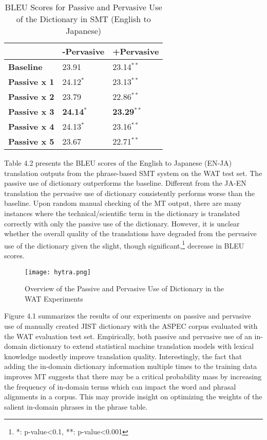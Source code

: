 \begin{table}[H]
\centering
    \begin{tabular}{l|ll}
    ~           & \textbf{-Pervasive} &\textbf{ +Pervasive }\\ \hline
    \textbf{Baseline}    & 23.91      & 23.14$^{**}$      \\ \hline
    \textbf{Passive x 1 }& 24.12$^{*}$     &  23.13$^{**}$   \\
    \textbf{Passive x 2} & 23.79    & 22.86$^{**}$      \\
    \textbf{Passive x 3 }&  \textbf{24.14$^{*}$}   & \textbf{23.29$^{**}$}      \\
    \textbf{Passive x 4 }& 24.13$^{*}$     &  23.16$^{**}$   \\
    \textbf{Passive x 5 }& 23.67      &  22.71$^{**}$   \\
    \end{tabular}
\caption{BLEU Scores for Passive and Pervasive Use of the Dictionary in SMT (English to Japanese)}
\label{table:hytraenja}
\end{table}

Table 4.2 presents the BLEU scores of the English to Japanese (EN-JA) translation outputs from the phrase-based SMT system on the WAT test set. The passive use of dictionary outperforms the baseline. Different from the JA-EN translation the pervasive use of dictionary consistently performs worse than the baseline. Upon random manual checking of the MT output, there are many instances where the technical/scientific term in the dictionary is translated correctly with only the passive use of the dictionary. However, it is unclear whether the overall quality of the translations have degraded from the pervasive use of the dictionary given the slight, though significant,\footnote{*: p-value<0.1, **: p-value<0.001} decrease in BLEU scores.

\begin{figure}[!htb]
\centering
	\hspace{-2em}%
	\texttt{[image: hytra.png]} \\[-1em]
	\caption{Overview of the Passive and Pervasive Use of Dictionary in the WAT Experiments}
	\label{fig-hytra}
\end{figure}

Figure 4.1 summarizes the results of our experiments on passive and pervasive use of manually created JIST dictionary with the ASPEC corpus evaluated with the WAT evaluation test set. Empirically, both passive and pervasive use of an in-domain dictionary to extend statistical machine translation models with lexical knowledge modestly improve translation quality. Interestingly, the fact that adding the in-domain dictionary information multiple times to the training data improves MT suggests that there may be a critical probability mass by increasing the frequency of in-domain terms which can impact the word and phrasal alignments in a corpus. This may provide insight on optimizing the weights of the salient in-domain phrases in the phrase table.

